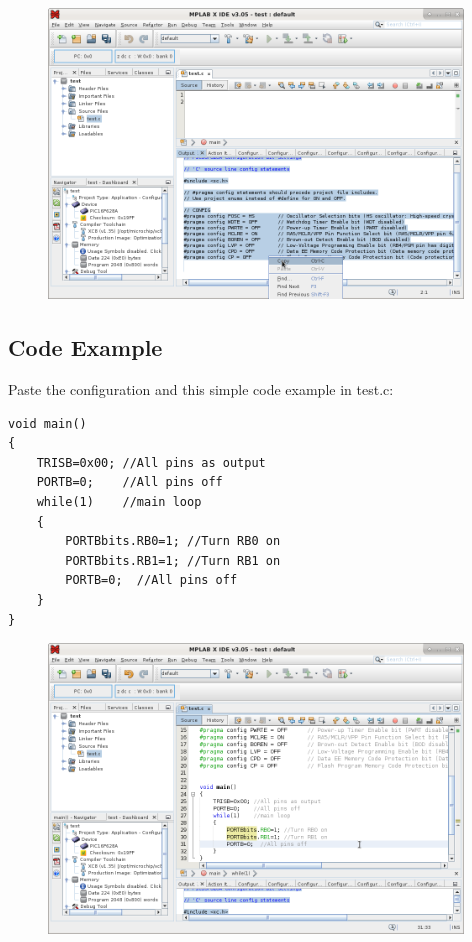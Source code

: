 \begin{figure}[H]
\center
\includegraphics[width=0.98\textwidth]{img/hmd/mplab21.png} 
\end{figure} 

\subsection{Code Example}

Paste the configuration and this simple code example in test.c:
\begin{verbatim}
void main()
{
    TRISB=0x00; //All pins as output
    PORTB=0;    //All pins off
    while(1)    //main loop
    {
        PORTBbits.RB0=1; //Turn RB0 on
        PORTBbits.RB1=1; //Turn RB1 on
        PORTB=0;  //All pins off
    }
}
\end{verbatim}


\begin{figure}[H]
\center
\includegraphics[width=0.98\textwidth]{img/hmd/mplab22.png} 
\end{figure} 

